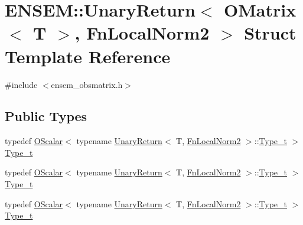 \hypertarget{structENSEM_1_1UnaryReturn_3_01OMatrix_3_01T_01_4_00_01FnLocalNorm2_01_4}{}\section{E\+N\+S\+EM\+:\+:Unary\+Return$<$ O\+Matrix$<$ T $>$, Fn\+Local\+Norm2 $>$ Struct Template Reference}
\label{structENSEM_1_1UnaryReturn_3_01OMatrix_3_01T_01_4_00_01FnLocalNorm2_01_4}


{\ttfamily \#include $<$ensem\+\_\+obsmatrix.\+h$>$}

\subsection*{Public Types}
\begin{DoxyCompactItemize}
\item 
typedef \mbox{\hyperlink{classENSEM_1_1OScalar}{O\+Scalar}}$<$ typename \mbox{\hyperlink{structENSEM_1_1UnaryReturn}{Unary\+Return}}$<$ T, \mbox{\hyperlink{structENSEM_1_1FnLocalNorm2}{Fn\+Local\+Norm2}} $>$\+::\mbox{\hyperlink{structENSEM_1_1UnaryReturn_3_01OMatrix_3_01T_01_4_00_01FnLocalNorm2_01_4_a9961e369c46fba05c0388f2ac5bef1ca}{Type\+\_\+t}} $>$ \mbox{\hyperlink{structENSEM_1_1UnaryReturn_3_01OMatrix_3_01T_01_4_00_01FnLocalNorm2_01_4_a9961e369c46fba05c0388f2ac5bef1ca}{Type\+\_\+t}}
\item 
typedef \mbox{\hyperlink{classENSEM_1_1OScalar}{O\+Scalar}}$<$ typename \mbox{\hyperlink{structENSEM_1_1UnaryReturn}{Unary\+Return}}$<$ T, \mbox{\hyperlink{structENSEM_1_1FnLocalNorm2}{Fn\+Local\+Norm2}} $>$\+::\mbox{\hyperlink{structENSEM_1_1UnaryReturn_3_01OMatrix_3_01T_01_4_00_01FnLocalNorm2_01_4_a9961e369c46fba05c0388f2ac5bef1ca}{Type\+\_\+t}} $>$ \mbox{\hyperlink{structENSEM_1_1UnaryReturn_3_01OMatrix_3_01T_01_4_00_01FnLocalNorm2_01_4_a9961e369c46fba05c0388f2ac5bef1ca}{Type\+\_\+t}}
\item 
typedef \mbox{\hyperlink{classENSEM_1_1OScalar}{O\+Scalar}}$<$ typename \mbox{\hyperlink{structENSEM_1_1UnaryReturn}{Unary\+Return}}$<$ T, \mbox{\hyperlink{structENSEM_1_1FnLocalNorm2}{Fn\+Local\+Norm2}} $>$\+::\mbox{\hyperlink{structENSEM_1_1UnaryReturn_3_01OMatrix_3_01T_01_4_00_01FnLocalNorm2_01_4_a9961e369c46fba05c0388f2ac5bef1ca}{Type\+\_\+t}} $>$ \mbox{\hyperlink{structENSEM_1_1UnaryReturn_3_01OMatrix_3_01T_01_4_00_01FnLocalNorm2_01_4_a9961e369c46fba05c0388f2ac5bef1ca}{Type\+\_\+t}}
\end{DoxyCompactItemize}


